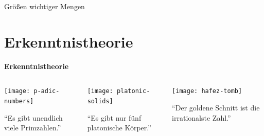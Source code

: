 \documentclass[12pt,compress,ngerman,utf8,t]{beamer}
\newcommand{\hil}[1]{{\usebeamercolor[fg]{item}{\textbf{#1}}}}
\begin{document}
\begin{frame}{Größen wichtiger Mengen}
\begin{itemize}
    \begin{center}\end{center}
  \end{itemize}
\end{frame}


\section{Erkenntnistheorie}

\begin{frame}
  \centering
  \bigskip

  \Huge \hil{Teil III}

  \bigskip
  \Large\textbf{Erkenntnistheorie}
  \par
  \normalsize
  \bigskip
  \bigskip
  \bigskip
  \bigskip

  \begin{columns}[t]
    \begin{column}{0.32\textwidth}
      \centering\texttt{[image: p-adic-numbers]}
      \medskip

      "`Es gibt unendlich viele Primzahlen."'
    \end{column}
    \begin{column}{0.32\textwidth}
      \centering\texttt{[image: platonic-solids]}
      \medskip

      "`Es gibt nur fünf platonische Körper."'
    \end{column}
    \begin{column}{0.37\textwidth}
      \centering\texttt{[image: hafez-tomb]}
      \medskip

      "`Der goldene Schnitt ist die irrationalste Zahl."'
    \end{column}
  \end{columns}
\end{frame}
\end{document}
